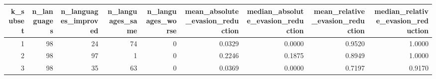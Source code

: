 \begin{tabular}{rrrrrrrrr}
\toprule
k\_subset & n\_languages & n\_languages\_improved & n\_languages\_same & n\_languages\_worse & mean\_absolute\_evasion\_reduction & median\_absolute\_evasion\_reduction & mean\_relative\_evasion\_reduction & median\_relative\_evasion\_reduction \\
\midrule
1 & 98 & 24 & 74 & 0 & 0.0329 & 0.0000 & 0.9520 & 1.0000 \\
2 & 98 & 97 & 1 & 0 & 0.2246 & 0.1875 & 0.8949 & 1.0000 \\
3 & 98 & 35 & 63 & 0 & 0.0369 & 0.0000 & 0.7197 & 0.9170 \\
\bottomrule
\end{tabular}
